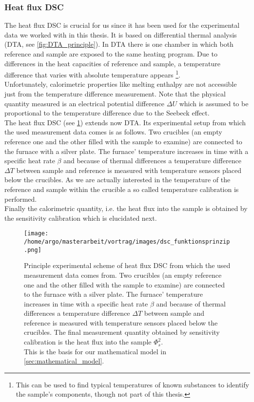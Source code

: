 \documentclass{scrartcl}[12pt, halfparskip]
\numberwithin{equation}{section}
\numberwithin{figure}{section}
\numberwithin{table}{section}
\begin{document}
\subsubsection{Heat flux DSC}
\label{sec:heat_flux_dsc}
The heat flux DSC is crucial for us since it has been used for the experimental data we worked with in this thesis. It is based on differential thermal analysis (DTA, see \cref{fig:DTA_principle}). 
In DTA there is one chamber in which both reference and sample are exposed to the same heating program.
Due to differences in the heat capacities of reference and sample, a temperature difference that varies with absolute temperature appears \footnote{This can be used to find typical temperatures of known substances to identify the sample's components, though not part of this thesis.}. \\
Unfortunately, calorimetric properties like melting enthalpy are not accessible just from the temperature difference measurement. 
Note that the physical quantity measured is an electrical potential difference $\Delta U$ which is assumed to be proportional to the temperature difference due to the Seebeck effect. \\
The heat flux DSC (see \cref{fig:heat_flux_DSC}) extends now DTA. Its experimental setup from which the used measurement data comes is as follows. Two crucibles (an empty reference one and the other filled with the sample to examine) are connected to the furnace with a silver plate. The furnace' temperature increases in time with a specific heat rate $\beta$ and because of thermal differences a temperature difference $\Delta T$ between sample and reference is measured with temperature sensors placed below the crucibles. As we are actually interested in the temperature of the reference and sample within the crucible a so called temperature calibration is performed. \\
Finally the calorimetric quantity, i.e. the heat flux into the sample is obtained by the sensitivity calibration which is elucidated next.


\begin{figure}[H]
	\centering
	\texttt{[image: /home/argo/masterarbeit/vortrag/images/dsc\_funktionsprinzip.png]}
	\caption{Principle experimental scheme of heat flux DSC from which the used measurement data comes from. Two crucibles (an empty reference one and the other filled with the sample to examine) are connected to the furnace with a silver plate. The furnace' temperature increases in time with a specific heat rate $\beta$ and because of thermal differences a temperature difference $\Delta T$ between sample and reference is measured with temperature sensors placed below the crucibles. The final measurement quantity obtained by sensitivity calibration is the heat flux into the sample $\varPhi_s^2$. \\
	This is the basis for our mathematical model in \cref{sec:mathematical_model}.}
	\label{fig:heat_flux_DSC}
\end{figure}
\end{document}
